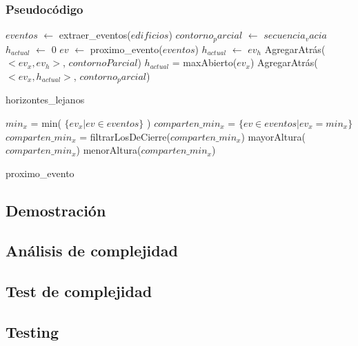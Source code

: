 \subsubsection{Pseudoc\'odigo}
\begin{algorithm}[H]
\begin{algorithmic}
\STATE $eventos$ $\gets$ extraer\_eventos($edificios$)
\STATE $contorno_parcial$ $\gets$ $secuencia_vacia$
\STATE $h_{actual}$ $\gets$ 0
	\STATE $ev$ $\gets$ proximo\_evento($eventos$)
			\STATE $h_{actual}$ $\gets$ $ev_h$
			\STATE AgregarAtrás($<ev_x, ev_h>$, $contornoParcial$)
		\ENDIF
	\ELSE
			\STATE $h_{actual}$ = maxAbierto($ev_x$)
			\STATE AgregarAtrás($<ev_x, h_{actual}>$, $contorno_parcial$)  
		\ENDIF
	\ENDIF
\ENDWHILE
\caption{horizontes\_lejanos}
\end{algorithmic}
\end{algorithm}

\begin{algorithm}[H]
\begin{algorithmic}
	\STATE $min_x$ = min( $\{ ev_x | ev \in eventos\}$ )
	\STATE $comparten\_min_x$ = $\{ ev \in eventos | ev_x = min_x \}$
		\STATE $comparten\_min_x$ = filtrarLosDeCierre($comparten\_min_x$)
		\RETURN mayorAltura($comparten\_min_x$)
	\ELSE
		\RETURN menorAltura($comparten\_min_x$)
	\ENDIF
\caption{proximo\_evento}
\end{algorithmic}
\end{algorithm}

\subsection{Demostraci\'on}


\subsection{An\'alisis de complejidad}


\subsection{Test de complejidad}

\subsection{Testing}































